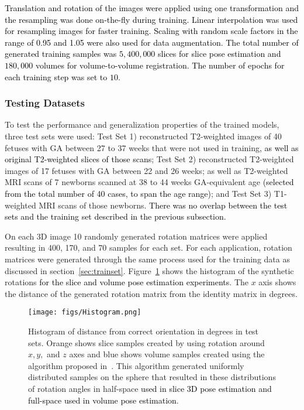 \documentclass[journal,transmag]{IEEEtran}
\begin{document}
\textcolor{black}{Translation and rotation of the images were applied using one transformation and the resampling was done on-the-fly during training. Linear interpolation was used for resampling images for faster training. Scaling with random scale factors in the range of 0.95 and 1.05 were also used for data augmentation. The total number of generated training samples was $5,400,000$ slices for slice pose estimation and $180,000$ volumes for volume-to-volume registration. The number of epochs for each training step was set to $10$.}  

\subsubsection{Testing Datasets}
To test the performance and generalization properties of the trained models, three test sets were used: Test Set 1) reconstructed T2-weighted images of 40 fetuses with GA between 27 to 37 weeks that were not used in training\textcolor{black}{, as well as original T2-weighted slices of those scans}; Test Set 2) reconstructed T2-weighted images of 17 fetuses with GA between 22 and 26 weeks; as well as T2-weighted MRI scans of 7 newborns scanned at 38 to 44 weeks GA-equivalent age \textcolor{black}{(selected from the total number of 40 cases, to span the age range)}; and Test Set 3) T1-weighted MRI scans of those newborns. \textcolor{black}{There was no overlap between the test sets and the training set described in the previous subsection.}

On each 3D image 10 randomly generated rotation matrices were applied resulting in 400, 170, and 70 samples for each set. For each application, rotation matrices were generated through the same process used for the training data as discussed in section~\ref{sec:trainset}. Figure~\ref{fig:Histogram} shows the histogram of the synthetic rotations \textcolor{black}{for the slice and volume pose estimation experiments}. The $x$ axis shows the distance of the generated rotation matrix from the identity matrix in degrees.%

\begin{figure}
    \centering
    \texttt{[image: figs/Histogram.png]}
    \caption{Histogram of distance from correct orientation in degrees in test sets. Orange shows slice samples created by using rotation around $x, y,$ and $z$ axes and blue shows volume samples created using the algorithm proposed in~\cite[p.~355]{arvo2013graphics}. This algorithm generated uniformly distributed samples on the sphere that resulted in these distributions of rotation angles in half-space \textcolor{black}{used in slice 3D pose estimation and full-space used in volume pose estimation}.}
    \label{fig:Histogram}
\end{figure}
\end{document}
